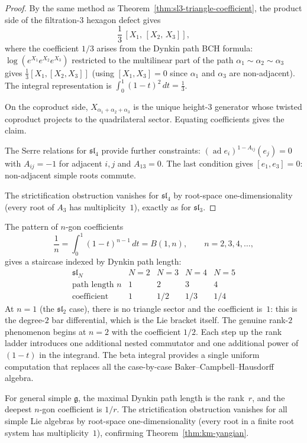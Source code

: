 \begin{proof}
By the same method as Theorem~\ref{thm:sl3-triangle-coefficient},
the product side of the filtration-$3$ hexagon defect gives
\[
\frac{1}{3}\,[X_1,\,[X_2,\,X_3]],
\]
where the coefficient $1/3$ arises from the Dynkin path
BCH formula: $\log(e^{X_1}e^{X_2}e^{X_3})$ restricted to the
multilinear part of the path $\alpha_1\sim\alpha_2\sim\alpha_3$
gives $\frac{1}{3}[X_1,[X_2,X_3]]$ (using $[X_1,X_3]=0$ since
$\alpha_1$ and $\alpha_3$ are non-adjacent). The integral
representation is $\int_0^1(1-t)^2\,dt=\frac{1}{3}$.

On the coproduct side, $X_{\alpha_1+\alpha_2+\alpha_3}$ is the
unique height-$3$ generator whose twisted coproduct projects to the
quadrilateral sector. Equating coefficients gives the claim.

The Serre relations for $\mathfrak{sl}_4$ provide further
constraints: $(\operatorname{ad}e_i)^{1-A_{ij}}(e_j)=0$ with
$A_{ij}=-1$ for adjacent $i,j$ and $A_{13}=0$.
The last condition gives $[e_1,e_3]=0$: non-adjacent simple
roots commute.

The strictification obstruction vanishes for $\mathfrak{sl}_4$ by
root-space one-dimensionality (every root of $A_3$ has
multiplicity~$1$), exactly as for $\mathfrak{sl}_3$.
\end{proof}

\begin{remark}
\label{rem:beta-staircase}
The pattern of $n$-gon coefficients
\[
\frac{1}{n}=\int_0^1(1-t)^{n-1}\,dt=B(1,n),
\qquad n=2,3,4,\ldots,
\]
gives a staircase indexed by Dynkin path length:
\[
\begin{array}{c|cccc}
\mathfrak{sl}_N & N=2 & N=3 & N=4 & N=5 \\
\hline
\text{path length }n & 1 & 2 & 3 & 4 \\
\text{coefficient} & 1 & 1/2 & 1/3 & 1/4
\end{array}
\]
At $n=1$ (the $\mathfrak{sl}_2$ case), there is no triangle sector
and the coefficient is~$1$: this is the degree-$2$ bar differential,
which is the Lie bracket itself. The genuine rank-$2$ phenomenon
begins at $n=2$ with the coefficient $1/2$. Each step up the
rank ladder introduces one additional nested commutator and one
additional power of $(1-t)$ in the integrand. The beta integral
provides a single uniform computation that replaces all the
case-by-case Baker--Campbell--Hausdorff algebra.

For general simple $\mathfrak{g}$, the maximal Dynkin path
length is the rank~$r$, and the deepest $n$-gon coefficient is
$1/r$. The strictification obstruction vanishes for all simple
Lie algebras by root-space one-dimensionality (every root in a
finite root system has multiplicity~$1$), confirming
Theorem~\ref{thm:km-yangian}.
\end{remark}


